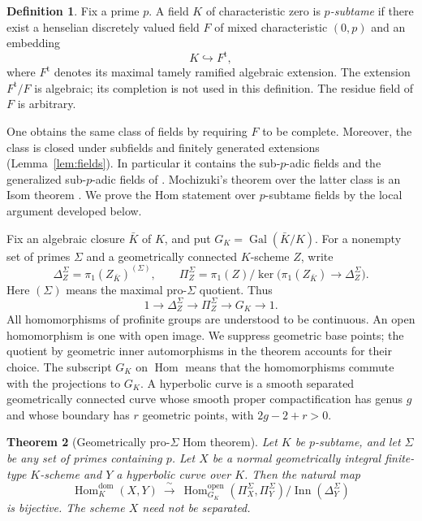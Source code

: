 \documentclass[11pt,a4paper]{article}
\numberwithin{equation}{section}
\theoremstyle{plain}
\newtheorem{theorem}{Theorem}[section]
\theoremstyle{definition}
\newtheorem{definition}[theorem]{Definition}
\theoremstyle{remark}
\newcommand{\tame}{\mathrm{t}}
\DeclareMathOperator{\Hom}{Hom}
\DeclareMathOperator{\Inn}{Inn}
\DeclareMathOperator{\Gal}{Gal}
\begin{document}
\begin{definition}
\label{def:subtame}
Fix a prime $p$. A field $K$ of characteristic zero is \emph{$p$-subtame} if
there exist a henselian discretely valued field $F$ of mixed characteristic
$(0,p)$ and an embedding
\[
                         K\hookrightarrow F^{\tame},
\]
where $F^{\tame}$ denotes its maximal tamely ramified algebraic extension.
The extension $F^{\tame}/F$ is algebraic; its completion is not used in this
definition. The residue field of $F$ is arbitrary.
\end{definition}

One obtains the same class of fields by requiring $F$ to be complete.
Moreover, the class is closed under subfields and finitely generated
extensions (Lemma~\ref{lem:fields}). In particular it contains the
sub-$p$-adic fields and the generalized sub-$p$-adic fields of
\cite[Definition~4.11]{Mochizuki2003}. Mochizuki's theorem over the latter
class is an Isom theorem \cite[Theorem~4.12]{Mochizuki2003}.
We prove the Hom statement over $p$-subtame fields by the local argument
developed below.

Fix an algebraic closure $\bar K$ of $K$, and put $G_K=\Gal(\bar K/K)$.
For a nonempty set of primes $\Sigma$ and a geometrically connected
$K$-scheme $Z$, write
\[
 \Delta_Z^\Sigma=\pi_1(Z_{\bar K})^{(\Sigma)},\qquad
 \Pi_Z^\Sigma=\pi_1(Z)\big/
       \ker\bigl(\pi_1(Z_{\bar K})\longrightarrow\Delta_Z^\Sigma\bigr).
\]
Here $(\Sigma)$ means the maximal pro-$\Sigma$ quotient. Thus
\begin{equation}
 1\longrightarrow\Delta_Z^\Sigma\longrightarrow\Pi_Z^\Sigma
       \longrightarrow G_K\longrightarrow1.
 \label{eq:arithmetic-sequence}
\end{equation}
All homomorphisms of profinite groups are understood to be continuous.
An open homomorphism is one with open image. We suppress geometric base
points; the quotient by geometric inner automorphisms in the theorem
accounts for their choice. The subscript $G_K$ on $\Hom$ means that the
homomorphisms commute with the projections to $G_K$.
A hyperbolic curve is a smooth separated
geometrically connected curve whose smooth proper compactification has
genus $g$ and whose boundary has $r$ geometric points, with $2g-2+r>0$.

\begin{theorem}[Geometrically pro-$\Sigma$ Hom theorem]
\label{thm:main}
Let $K$ be $p$-subtame, and let $\Sigma$ be any set of primes containing $p$.
Let $X$ be a normal geometrically integral finite-type $K$-scheme and $Y$ a
hyperbolic curve over $K$. Then the natural map
\begin{equation}
 \Hom_K^{\mathrm{dom}}(X,Y)\ \xrightarrow{\ \sim\ }\
 \Hom_{G_K}^{\mathrm{open}}(\Pi_X^\Sigma,\Pi_Y^\Sigma)
                  /\Inn(\Delta_Y^\Sigma)
 \label{eq:main}
\end{equation}
is bijective. The scheme $X$ need not be separated.
\end{theorem}
\end{document}
